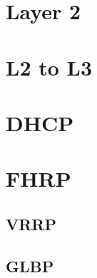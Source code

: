 \documentclass[a4paper,12pt,twoside,twocolumn,landscape]{book}
\begin{document}


\tableofcontents

\setlength{\parskip}{0.35em} %
\renewcommand{\baselinestretch}{1.15} %

	




\chapter{Layer 2}



\newpage




\chapter{L2 to L3}




\chapter{DHCP}




\chapter{FHRP}

\section{VRRP}

\section{GLBP}
\end{document}
